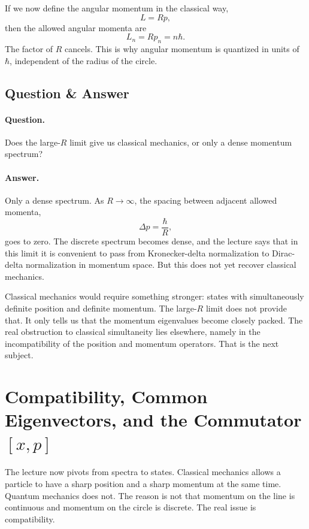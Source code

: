 If we now define the angular momentum in the classical way,
\begin{equation}
L=Rp,
\end{equation}
then the allowed angular momenta are
\begin{equation}
L_n=Rp_n=n\hbar.
\end{equation}
The factor of \(R\) cancels. This is why angular momentum is quantized in units of \(\hbar\), independent of the radius of the circle.

\subsection{Question \& Answer}

\paragraph{Question.} Does the large-\(R\) limit give us classical mechanics, or only a dense momentum spectrum?

\paragraph{Answer.} Only a dense spectrum. As \(R\to\infty\), the spacing between adjacent allowed momenta,
\[
\Delta p = \frac{\hbar}{R},
\]
goes to zero. The discrete spectrum becomes dense, and the lecture says that in this limit it is convenient to pass from Kronecker-delta normalization to Dirac-delta normalization in momentum space. But this does not yet recover classical mechanics.

Classical mechanics would require something stronger: states with simultaneously definite position and definite momentum. The large-\(R\) limit does not provide that. It only tells us that the momentum eigenvalues become closely packed. The real obstruction to classical simultaneity lies elsewhere, namely in the incompatibility of the position and momentum operators. That is the next subject.

\section{Compatibility, Common Eigenvectors, and the Commutator \texorpdfstring{\([x,p]\)}{[x,p]}}

The lecture now pivots from spectra to states. Classical mechanics allows a particle to have a sharp position and a sharp momentum at the same time. Quantum mechanics does not. The reason is not that momentum on the line is continuous and momentum on the circle is discrete. The real issue is compatibility.

